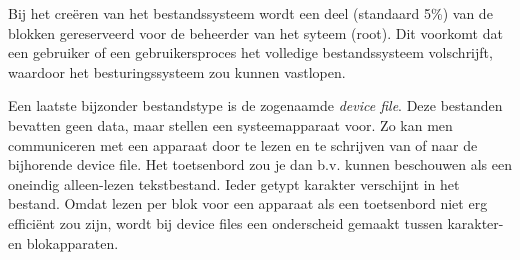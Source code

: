 Bij het cre\"eren van het bestandssysteem wordt een deel (standaard 5\%) van de blokken gereserveerd voor
de beheerder van het syteem (root). Dit voorkomt dat een gebruiker of een gebruikersproces het volledige
bestandssysteem volschrijft, waardoor het besturingssysteem zou kunnen vastlopen.

Een laatste bijzonder bestandstype is de zogenaamde \emph{device file}. Deze bestanden bevatten geen data, maar
stellen een systeemapparaat voor. Zo kan men communiceren met een apparaat door te lezen en te schrijven van of
naar de bijhorende device file. Het toetsenbord zou je dan b.v. kunnen beschouwen als een oneindig alleen-lezen
tekstbestand. Ieder getypt karakter verschijnt in het bestand. Omdat lezen per blok voor een apparaat als een
toetsenbord niet erg effici\"ent zou zijn, wordt bij device files een onderscheid gemaakt tussen karakter- en
blokapparaten.
